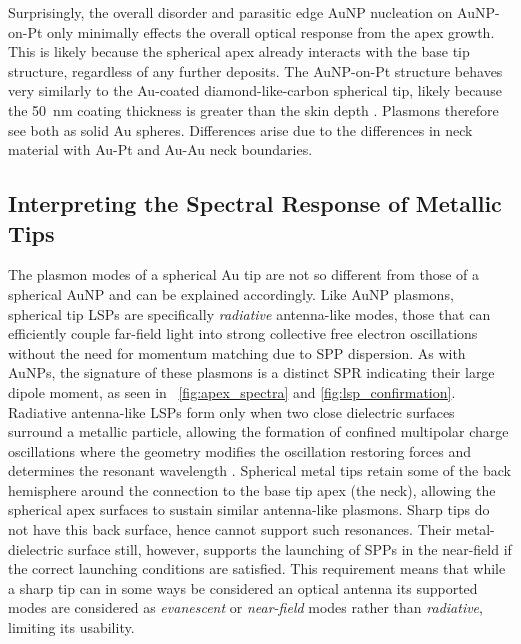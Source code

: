 \documentclass{article}
\begin{document}
Surprisingly, the overall disorder and parasitic edge AuNP nucleation on AuNP-on-Pt only minimally effects the overall optical response from the apex growth. This is likely because the spherical apex already interacts with the base tip structure, regardless of any further deposits. The AuNP-on-Pt structure behaves very similarly to the Au-coated diamond-like-carbon spherical tip, likely because the \SI{50}{nm} coating thickness is greater than the skin depth \cite{stockman2011, huber2014}. Plasmons therefore see both as solid Au spheres. Differences arise due to the differences in neck material with Au-Pt and Au-Au neck boundaries.

\FloatBarrier
\subsection{Interpreting the Spectral Response of Metallic Tips}

The plasmon modes of a spherical Au tip are not so different from those of a spherical AuNP and can be explained accordingly. Like AuNP plasmons, spherical tip LSPs are specifically \emph{radiative} antenna-like modes, those that can efficiently couple far-field light into strong collective free electron oscillations without the need for momentum matching due to SPP dispersion. As with AuNPs, the signature of these plasmons is a distinct SPR indicating their large dipole moment, as seen in \figurenames~\ref{fig:apex_spectra} and \ref{fig:lsp_confirmation}. Radiative antenna-like LSPs form only when two close dielectric surfaces surround a metallic particle, allowing the formation of confined multipolar charge oscillations where the geometry modifies the oscillation restoring forces and determines the resonant wavelength \cite{mock2002, kuwata2003}. Spherical metal tips retain some of the back hemisphere around the connection to the base tip apex (the neck), allowing the spherical apex surfaces to sustain similar antenna-like plasmons. Sharp tips do not have this back surface, hence cannot support such resonances.
Their metal-dielectric surface still, however, supports the launching of SPPs in the near-field if the correct launching conditions are satisfied. This requirement means that while a sharp tip can in some ways be considered an optical antenna its supported modes are considered as \emph{evanescent} or \emph{near-field} modes rather than \emph{radiative}, limiting its usability.
\end{document}
